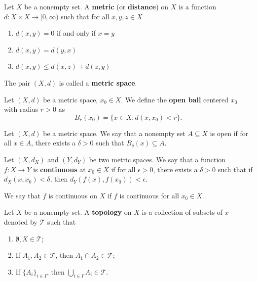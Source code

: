 \documentclass[a4paper]{article}
\begin{document}
\begin{definition}[Metric]
    Let \( X  \) be a nonempty set. A \textbf{metric} (or \textbf{distance}) on \( X  \) is a function \( d : X \times X \to [0,\infty)  \) such that for all \( x,y, z \in X  \)
    \begin{enumerate}
        \item[(i)] \( d(x,y) = 0  \) if and only if \( x = y  \)
        \item[(ii)] \( d(x,y) = d(y,x) \)
        \item[(iii)] \( d(x,y) \leq d(x,z) + d(z,y) \) 
    \end{enumerate}
    The pair \( (X,d) \) is called a \textbf{metric space}. 
\end{definition}

\begin{definition}
    Let \( (X,d) \) be a metric space, \( {x}_{0} \in X  \). We define the \textbf{open ball} centered \( {x}_{0} \) with radius \( r > 0  \) as 
    \[  {B}_{r}({x}_{0}) = \{ x \in X : d(x,{x}_{0}) < r  \}. \]
\end{definition}

\begin{definition}
    Let \( (X,d) \) be a metric space. We say that a nonempty set \( A \subseteq X  \) is open if for all \( x \in A  \), there exists a \( \delta > 0  \) such that \( {B}_{\delta}(x) \subseteq A  \).
\end{definition}

\begin{definition}
    Let \( (X,{d}_{X}) \) and \( (Y, {d}_{Y}) \) be two metric spaces. We say that a function \( f: X \to Y  \) is \textbf{continuous} at \( {x}_{0} \in X   \) if for all \( \epsilon > 0  \), there exists a \( \delta > 0  \) such that if \( {d}_{X}(x,{x}_{0}) < \delta \), then \( {d}_{Y}(f(x), f({x}_{0})) < \epsilon \). 

    We say that \( f  \) is continuous on \( X  \) if \( f  \) is continuous for all \( {x}_{0} \in X  \).
\end{definition}

\begin{definition}[Topology]
   Let \( X  \) be a nonempty set. A \textbf{topology} on \( X  \) is a collection of subsets of \( x  \) denoted by \( \mathcal{T} \) such that  
   \begin{enumerate}
       \item[(i)] \( \emptyset, X \in \mathcal{T} \);
        \item[(ii)] If \( {A}_{1}, {A}_{2} \in \mathcal{T} \), then \( {A}_{1} \cap {A}_{2} \in \mathcal{T} \);
        \item[(iii)] If \( \{ {A}_{i} \}_{i \in I} \), then \( \bigcup_{ i \in I  }^{  }  {A}_{i} \in \mathcal{T} \).
   \end{enumerate}
\end{definition}
\end{document}
